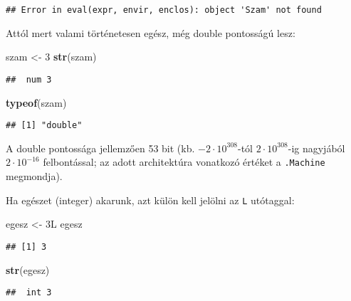 \documentclass[
]{book}
\newenvironment{Shaded}{\begin{snugshade}}{\end{snugshade}}
\newcommand{\DecValTok}[1]{\textcolor[rgb]{0.00,0.00,0.81}{#1}}
\newcommand{\KeywordTok}[1]{\textcolor[rgb]{0.13,0.29,0.53}{\textbf{#1}}}
\newcommand{\NormalTok}[1]{#1}
\newcommand{\StringTok}[1]{\textcolor[rgb]{0.31,0.60,0.02}{#1}}
\begin{document}
\begin{verbatim}
## Error in eval(expr, envir, enclos): object 'Szam' not found
\end{verbatim}

Attól mert valami történetesen egész, még double pontosságú lesz:

\begin{Shaded}
\begin{Highlighting}[]
\NormalTok{szam <-}\StringTok{ }\DecValTok{3}
\KeywordTok{str}\NormalTok{(szam)}
\end{Highlighting}
\end{Shaded}

\begin{verbatim}
##  num 3
\end{verbatim}

\begin{Shaded}
\begin{Highlighting}[]
\KeywordTok{typeof}\NormalTok{(szam)}
\end{Highlighting}
\end{Shaded}

\begin{verbatim}
## [1] "double"
\end{verbatim}

A double pontossága jellemzően 53 bit (kb. \(-2\cdot 10^{308}\)-tól \(2\cdot 10^{308}\)-ig nagyjából \(2\cdot 10^{-16}\) felbontással; az adott architektúra vonatkozó értéket a \texttt{.Machine} megmondja).

Ha egészet (integer) akarunk, azt külön kell jelölni az \texttt{L} utótaggal:

\begin{Shaded}
\begin{Highlighting}[]
\NormalTok{egesz <-}\StringTok{ }\NormalTok{3L}
\NormalTok{egesz}
\end{Highlighting}
\end{Shaded}

\begin{verbatim}
## [1] 3
\end{verbatim}

\begin{Shaded}
\begin{Highlighting}[]
\KeywordTok{str}\NormalTok{(egesz)}
\end{Highlighting}
\end{Shaded}

\begin{verbatim}
##  int 3
\end{verbatim}
\end{document}
